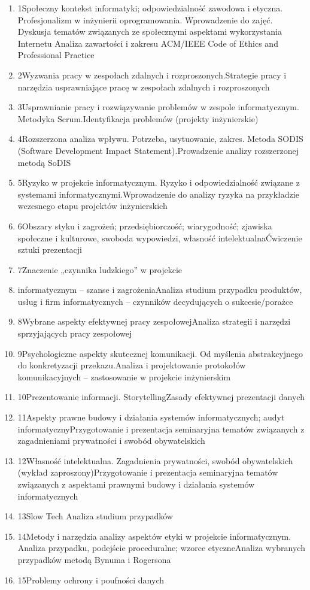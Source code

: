 \documentclass[12pt, a4paper]{article}
\begin{document}
\begin{enumerate}
  \item 1Społeczny kontekst informatyki; odpowiedzialność zawodowa i etyczna. Profesjonalizm w inżynierii oprogramowania. Wprowadzenie do zajęć. Dyskusja tematów związanych ze społecznymi aspektami wykorzystania Internetu Analiza zawartości i zakresu ACM/IEEE Code of Ethics and Professional Practice
  \item 2Wyzwania pracy w zespołach zdalnych i rozproszonych.Strategie pracy i narzędzia usprawniające pracę w zespołach zdalnych i rozproszonych
  \item 3Usprawnianie pracy i rozwiązywanie problemów w zespole informatycznym. Metodyka Scrum.Identyfikacja problemów (projekty inżynierskie)
  \item 4Rozszerzona analiza wpływu. Potrzeba, usytuowanie, zakres. Metoda SODIS (Software Development Impact Statement).Prowadzenie analizy rozszerzonej metodą SoDIS
  \item 5Ryzyko w projekcie informatycznym. Ryzyko i odpowiedzialność związane z systemami informatycznymi.Wprowadzenie do analizy ryzyka na przykładzie wczesnego etapu projektów inżynierskich
  \item 6Obszary styku i zagrożeń; przedsiębiorczość; wiarygodność; zjawiska społeczne i kulturowe, swoboda wypowiedzi, własność intelektualnaĆwiczenie sztuki prezentacji
  \item 7Znaczenie „czynnika ludzkiego” w projekcie
  \item informatycznym – szanse i zagrożeniaAnaliza studium przypadku produktów, usług i firm informatycznych – czynników decydujących o sukcesie/porażce
  \item 8Wybrane aspekty efektywnej pracy zespołowejAnaliza strategii i narzędzi sprzyjających pracy zespołowej
  \item 9Psychologiczne aspekty skutecznej komunikacji. Od myślenia abstrakcyjnego do konkretyzacji przekazu.Analiza i projektowanie protokołów komunikacyjnych – zastosowanie w projekcie inżynierskim
  \item 10Prezentowanie informacji. StorytellingZasady efektywnej prezentacji danych
  \item 11Aspekty prawne budowy i działania systemów informatycznych; audyt informatycznyPrzygotowanie i prezentacja seminaryjna tematów związanych z zagadnieniami prywatności i swobód obywatelskich
  \item 12Własność intelektualna. Zagadnienia prywatności, swobód obywatelskich (wykład zaproszony)Przygotowanie i prezentacja seminaryjna tematów związanych z aspektami prawnymi budowy i działania systemów informatycznych
  \item 13Slow Tech Analiza studium przypadków
  \item 14Metody i narzędzia analizy aspektów etyki w projekcie informatycznym. Analiza przypadku, podejście proceduralne; wzorce etyczneAnaliza wybranych przypadków metodą Bynuma i Rogersona
  \item 15Problemy ochrony i poufności danych
\end{enumerate}
\end{document}
